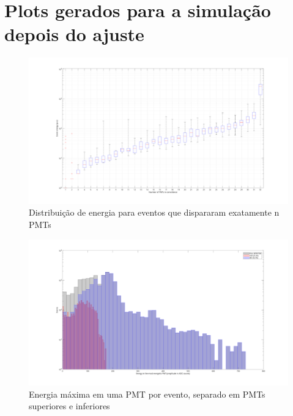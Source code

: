 \chapter{Plots gerados para a simulação depois do ajuste}\label{apdx:simulacao}

\begin{figure}[H]
	\centering
	\includegraphics[width=16cm]{postextuais/apendice/simulacao/boxplot.png}
	\caption{Distribuição de energia para eventos que dispararam exatamente n PMTs }
	\label{fig:transf}
\end{figure}

\begin{figure}[H]
	\centering
	\includegraphics[width=16cm]{postextuais/apendice/simulacao/energ_max_adc.png}
	\caption{Energia máxima em uma PMT por evento, separado em PMTs superiores e inferiores }
	\label{fig:transf}
\end{figure}

